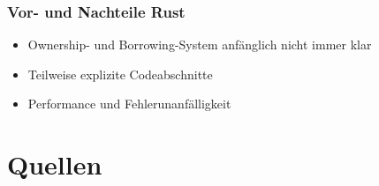 \documentclass{beamer}
\begin{document}
\begin{frame}[fragile]
  \frametitle{Vor- und Nachteile Rust}
  \begin{itemize}
    \item Ownership- und Borrowing-System anfänglich nicht immer klar
    \pause
    \item Teilweise explizite Codeabschnitte
    \pause
    \item Performance und Fehlerunanfälligkeit
  \end{itemize}
\end{frame}

\section{Quellen}
\begin{frame}
  
  \raggedright
  
\end{frame}
\end{document}

